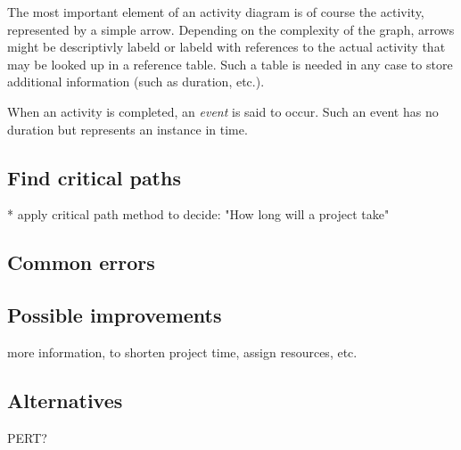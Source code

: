 The most important element of an activity diagram is of course the activity, represented by a simple
arrow. Depending on the complexity of the graph, arrows might be descriptivly labeld or labeld with
references to the actual activity that may be looked up in a reference table. Such a table is needed
in any case to store additional information (such as duration, etc.). 

When an activity is completed, an \emph{event} is said to occur. Such an event has no 
duration but represents an instance in time. 

\subsection{Find critical paths}
* apply critical path method to decide: "How long will a project take"

\subsection{Common errors}

\subsection{Possible improvements}
more information, to shorten project time, assign resources, etc.

\subsection{Alternatives}
PERT?

